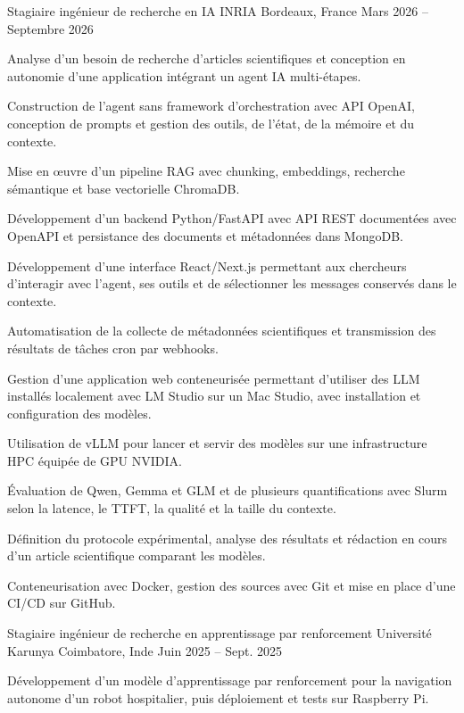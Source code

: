 
\begin{cventries}
  \cventry
    {Stagiaire ingénieur de recherche en IA}
    {INRIA}
    {Bordeaux, France}
    {Mars 2026 -- Septembre 2026}
    {
      \begin{cvitems}
        \item {Analyse d’un besoin de recherche d’articles scientifiques et conception en autonomie d’une application intégrant un agent IA multi-étapes.}
        \item {Construction de l’agent sans framework d’orchestration avec API OpenAI, conception de prompts et gestion des outils, de l’état, de la mémoire et du contexte.}
        \item {Mise en œuvre d’un pipeline RAG avec chunking, embeddings, recherche sémantique et base vectorielle ChromaDB.}
        \item {Développement d’un backend Python/FastAPI avec API REST documentées avec OpenAPI et persistance des documents et métadonnées dans MongoDB.}
        \item {Développement d’une interface React/Next.js permettant aux chercheurs d’interagir avec l’agent, ses outils et de sélectionner les messages conservés dans le contexte.}
        \item {Automatisation de la collecte de métadonnées scientifiques et transmission des résultats de tâches cron par webhooks.}
        \item {Gestion d’une application web conteneurisée permettant d’utiliser des LLM installés localement avec LM Studio sur un Mac Studio, avec installation et configuration des modèles.}
        \item {Utilisation de vLLM pour lancer et servir des modèles sur une infrastructure HPC équipée de GPU NVIDIA.}
        \item {Évaluation de Qwen, Gemma et GLM et de plusieurs quantifications avec Slurm selon la latence, le TTFT, la qualité et la taille du contexte.}
        \item {Définition du protocole expérimental, analyse des résultats et rédaction en cours d’un article scientifique comparant les modèles.}
        \item {Conteneurisation avec Docker, gestion des sources avec Git et mise en place d’une CI/CD sur GitHub.}
      \end{cvitems}
    }

  \cventry
    {Stagiaire ingénieur de recherche en apprentissage par renforcement}
    {Université Karunya}
    {Coimbatore, Inde}
    {Juin 2025 -- Sept. 2025}
    {
      \begin{cvitems}
        \item {Développement d’un modèle d’apprentissage par renforcement pour la navigation autonome d’un robot hospitalier, puis déploiement et tests sur Raspberry Pi.}
      \end{cvitems}
    }
\end{cventries}
